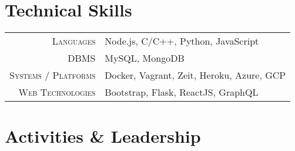 \documentclass[a4paper,10pt]{extarticle} %
\begin{document}
\vspace{-0.6cm}
\section{\textcolor{primary}{Technical Skills}}

\begin{tabular}{r|p{15cm}}
\textsc{Languages} & Node.js, C/C++, Python, JavaScript \\
\textsc{DBMS} & MySQL, MongoDB \\
\textsc{Systems / Platforms} & Docker, Vagrant, Zeit, Heroku, Azure, GCP \\
\textsc{Web Technologies} & Bootstrap, Flask, ReactJS, GraphQL \\
\end{tabular}


\vspace{-0.2cm}
\section{\textcolor{primary}{Activities \& Leadership}}
\end{document}
